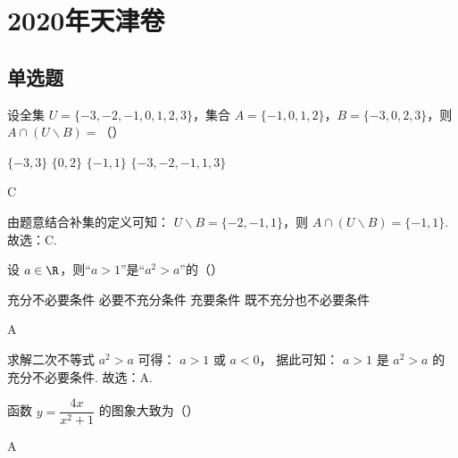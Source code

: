 \chapter{2020年天津卷}

\section{单选题}

\begin{problem}
设全集 \(U=\{-3,-2,-1,0,1,2,3\}\)，集合 \(A=\{-1,0,1,2\}\)，\(B=\{-3,0,2,3\}\)，则 \(A\cap\left( U\smallsetminus B \right)=\)（\quad）

\choices
    {\(\{-3,3\}\)}
    {\(\{0,2\}\)}
    {\(\{-1,1\}\)}
    {\(\{-3,-2,-1,1,3\}\)}
\end{problem}

\begin{answer}
C
\end{answer}

\begin{solution}
由题意结合补集的定义可知： \( U\smallsetminus B=\{-2,-1,1\} \)，则 \( A\cap\left( U\smallsetminus B \right)=\{-1,1\} \).
故选：C.
\end{solution}

\begin{problem}
设 \(a\in\R\)，则“\(a>1\)”是“\(a^2>a\)”的（\quad）

\choices
    {充分不必要条件}
    {必要不充分条件}
    {充要条件}
    {既不充分也不必要条件}
\end{problem}

\begin{answer}
A
\end{answer}

\begin{solution}
求解二次不等式 \( a^2>a \) 可得： \( a>1 \) 或 \( a<0 \)，
据此可知： \( a>1 \) 是 \( a^2>a \) 的充分不必要条件.
故选：A.
\end{solution}

\begin{problem}
函数 \(y=\dfrac{4x}{x^2+1}\) 的图象大致为（\quad）

    {}
    {}
    {}
\end{problem}

\begin{answer}
A
\end{answer}

